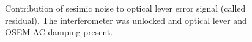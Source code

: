 \begin{figure}
\begin{centering}
\caption[Contribution of sesimic noise to optical lever error
signal]{Contribution of sesimic noise to optical lever error signal
  (called residual). The interferometer was unlocked and optical lever
  and OSEM AC damping present.}
\label{fig:OLcontributions}
\end{centering}
\end{figure}

